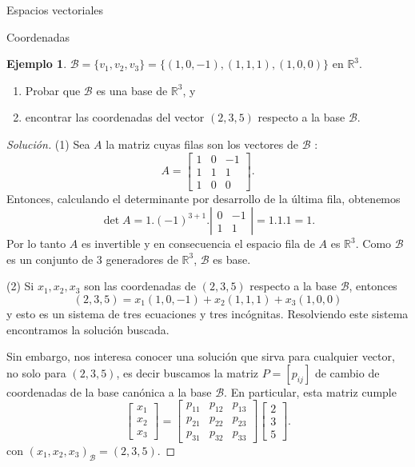 \documentclass[a4paper,12pt,twoside,spanish]{amsbook}
\theoremstyle{definition}
\newtheorem{ejemplo}{Ejemplo}[section]
\theoremstyle{remark}
\newcommand{\R}{\mathbb R}
\begin{document}
\begin{chapter}{Espacios vectoriales}
\begin{section}{Coordenadas}
	
	\begin{ejemplo}
		 $\mathcal{B} = \{v_1,v_2,v_3 \}=\{(1,0,-1),(1,1,1),(1,0,0) \}$ en $\R^3$.
		\begin{enumerate}
			\item Probar que $\mathcal{B}$ es una base de $\R^3$, y 
			\item encontrar las coordenadas del vector  $(2,3,5)$ respecto a la base  $\mathcal{B}$. 
		\end{enumerate}
	\end{ejemplo}
\begin{proof}[Solución]
	(1) Sea $A$ la matriz cuyas filas son los vectores de $\mathcal{B}$ :
	$$
	A = \begin{bmatrix} 1&0&-1\\1&1&1\\1&0&0	\end{bmatrix}.
	$$
	Entonces,  calculando el determinante  por desarrollo de la última fila, obtenemos
	$$
	\det A = 1.(-1)^{3+1}. 
	\left| \begin{matrix} 0&-1\\1&1	\end{matrix} \right| = 1.1.1 =1.
	$$ 
	Por  lo tanto $A$ es invertible y en consecuencia el espacio fila de $A$ es $\R^3$. Como $\mathcal{B}$ es un conjunto de 3  generadores de  $\R^3$, $\mathcal{B}$ es base.
	
	(2) Si $x_1,x_2,x_3$  son las coordenadas de $(2,3,5)$ respecto a la base  $\mathcal{B}$, entonces
	$$
	(2,3,5) = x_1(1,0,-1)+x_2(1,1,1)+x_3(1,0,0)
	$$
	y esto es un sistema de tres ecuaciones y tres incógnitas.  Resolviendo este sistema encontramos la solución buscada. 
	
	Sin embargo,  nos interesa conocer una solución que sirva para cualquier vector, no solo para $(2,3,5)$, es decir buscamos la matriz $P = [p_{ij}]$ de cambio de coordenadas de la base canónica a la base $\mathcal B$. En particular,  esta matriz cumple 
	$$
	\begin{bmatrix} x_1\\x_2\\x_3 \end{bmatrix} = 
	\begin{bmatrix}p_{11} &p_{12}& p_{13} \\p_{21} &p_{22} & p_{23}\\ p_{31} &p_{32}& p_{33}\end{bmatrix}
	\begin{bmatrix} 2\\3\\5 \end{bmatrix}.
	$$
	con $(x_1,x_2,x_3)_{\mathcal B} = (2,3,5)$.
	

\end{proof}
\end{section}
\end{chapter}
\end{document}
